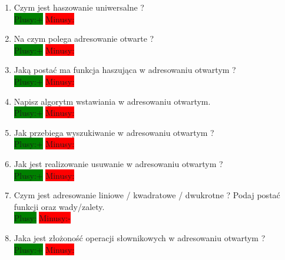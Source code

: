 \documentclass[a4paper,11pt]{article}
\begin{document}
\begin{enumerate}
\item Czym jest haszowanie uniwersalne ?
\\ \colorbox{green}{Plusy:+} \colorbox{red}{Minusy: } 

\item Na czym polega adresowanie otwarte ? 
\\ \colorbox{green}{Plusy:+} \colorbox{red}{Minusy: } 

\item Jaką postać ma funkcja haszująca w adresowaniu otwartym ?
\\ \colorbox{green}{Plusy:+} \colorbox{red}{Minusy: } 

\item Napisz algorytm wstawiania w adresowaniu otwartym.
\\ \colorbox{green}{Plusy:+} \colorbox{red}{Minusy: } 

\item Jak przebiega wyszukiwanie w adresowaniu otwartym ?
\\ \colorbox{green}{Plusy:+} \colorbox{red}{Minusy: } 

\item Jak jest realizowanie usuwanie w adresowaniu otwartym ?
\\ \colorbox{green}{Plusy:+} \colorbox{red}{Minusy: } 

\item Czym jest adresowanie liniowe / kwadratowe / dwukrotne ? Podaj postać funkcji oraz wady/zalety. 
\\ \colorbox{green}{Plusy:} \colorbox{red}{Minusy:-} 

\item Jaka jest złożoność operacji słownikowych w adresowaniu otwartym ?
\\ \colorbox{green}{Plusy:+} \colorbox{red}{Minusy: } 



\end{enumerate}
\end{document}
